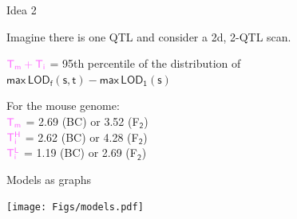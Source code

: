 \documentclass[12pt]{article}
\newcommand{\headsize}{\fontsize{35}{35} \selectfont}
\newcommand{\smallersize}{\fontsize{20}{25} \selectfont}
\newcommand{\lod}{\text{LOD}}
\begin{document}
\newpage

\addtocounter{page}{-1}

\headsize \color{myyellow}
\hfill \begin{minipage}{5.75in}
\centering
Idea 2
\end{minipage}

\vspace{3cm} \color{mywhite} \smallersize

\hfill \begin{minipage}{10in}

Imagine there is one QTL and consider a 2d, 2-QTL scan.

\vspace{1cm}

\hspace*{0.5in} $\mathsf{\color{mypink} T_m + T_i}$ = 95th percentile of the
  distribution of \\[6pt]
\hspace*{2.0in} {\color{myblue} $\mathsf{ \text{max} \, \lod_f(s,t) -
    \text{max} \, \lod_1(s)}$}


\vspace{2cm}

For the mouse genome: \\[12pt]
\hspace*{0.5in} $\mathsf{\color{mypink} T_m}$ = {\color{myblue}
  2.69} (BC) or {\color{myblue} 3.52} (F$_{\mathsf{2}}$) \\[12pt]
\hspace*{0.5in} $\mathsf{\color{mypink} T^H_i}$ = {\color{myblue}
  2.62} (BC) or {\color{myblue} 4.28} (F$_{\mathsf{2}}$) \\[12pt]
\hspace*{0.5in} $\mathsf{\color{mypink} T^L_i}$ = {\color{myblue}
  1.19} (BC) or {\color{myblue} 2.69} (F$_{\mathsf{2}}$)


\end{minipage}









\newpage

\headsize \color{myyellow}
\hfill \begin{minipage}{5.75in}
\centering
Models as graphs
\end{minipage}

\vfill

\centerline{\texttt{[image: Figs/models.pdf]}}
\end{document}
